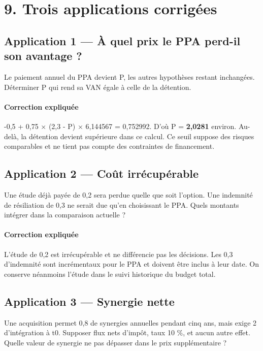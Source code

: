 \documentclass[12pt,a4paper]{article}
\begin{document}
\section*{9. Trois applications corrigées}

\subsection*{Application 1 --- À quel prix le PPA perd-il son avantage ?}
Le paiement annuel du PPA devient P, les autres hypothèses restant inchangées. Déterminer P qui rend sa VAN égale à celle de la détention.


\paragraph{Correction expliquée}
-0,5 + 0,75 $\times$ (2,3 - P) $\times$ 6,144567 = 0,752992. D’où P = \textbf{2,0281} environ. Au-delà, la détention devient supérieure dans ce calcul. Ce seuil suppose des risques comparables et ne tient pas compte des contraintes de financement.



\subsection*{Application 2 --- Coût irrécupérable}
Une étude déjà payée de 0,2 sera perdue quelle que soit l’option. Une indemnité de résiliation de 0,3 ne serait due qu’en choisissant le PPA. Quels montants intégrer dans la comparaison actuelle ?


\paragraph{Correction expliquée}
L’étude de 0,2 est irrécupérable et ne différencie pas les décisions. Les 0,3 d’indemnité sont incrémentaux pour le PPA et doivent être inclus à leur date. On conserve néanmoins l’étude dans le suivi historique du budget total.



\subsection*{Application 3 --- Synergie nette}
Une acquisition permet 0,8 de synergies annuelles pendant cinq ans, mais exige 2 d’intégration à t0. Supposer flux nets d’impôt, taux 10 \%, et aucun autre effet. Quelle valeur de synergie ne pas dépasser dans le prix supplémentaire ?
\end{document}
